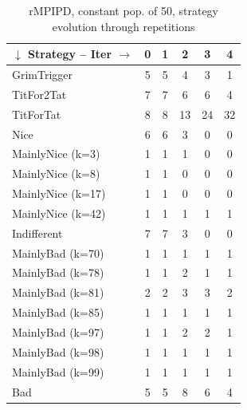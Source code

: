 \documentclass[journal,a4paper,10pt,twoside]{IEEEtran} %
\begin{document}
\begin{table}[ht]
	\caption{rMPIPD, constant pop. of 50, strategy evolution through repetitions}
	\label{tab:ripdmp-const}
	\centering
    \begin{tabular}{l|ccccc} \toprule
    	$\downarrow$ Strategy -- Iter $\rightarrow$  & 0 & 1 & 2  & 3  & 4  \\ \midrule
    	GrimTrigger       & 5 & 5 & 4  & 3  & 1  \\
    	TitFor2Tat        & 7 & 7 & 6  & 6  & 4  \\
    	TitForTat         & 8 & 8 & 13 & 24 & 32 \\
    	Nice              & 6 & 6 & 3  & 0  & 0  \\
    	MainlyNice (k=3)  & 1 & 1 & 1  & 0  & 0  \\
    	MainlyNice (k=8)  & 1 & 1 & 0  & 0  & 0  \\
    	MainlyNice (k=17) & 1 & 1 & 0  & 0  & 0  \\
    	MainlyNice (k=42) & 1 & 1 & 1  & 1  & 1  \\
    	Indifferent       & 7 & 7 & 3  & 0  & 0  \\
    	MainlyBad (k=70)  & 1 & 1 & 1  & 1  & 1  \\
    	MainlyBad (k=78)  & 1 & 1 & 2  & 1  & 1  \\
    	MainlyBad (k=81)  & 2 & 2 & 3  & 3  & 2  \\
    	MainlyBad (k=85)  & 1 & 1 & 1  & 1  & 1  \\
    	MainlyBad (k=97)  & 1 & 1 & 2  & 2  & 1  \\
    	MainlyBad (k=98)  & 1 & 1 & 1  & 1  & 1  \\
    	MainlyBad (k=99)  & 1 & 1 & 1  & 1  & 1  \\
    	Bad               & 5 & 5 & 8  & 6  & 4  \\ \bottomrule
    \end{tabular}
\end{table}
\end{document}
